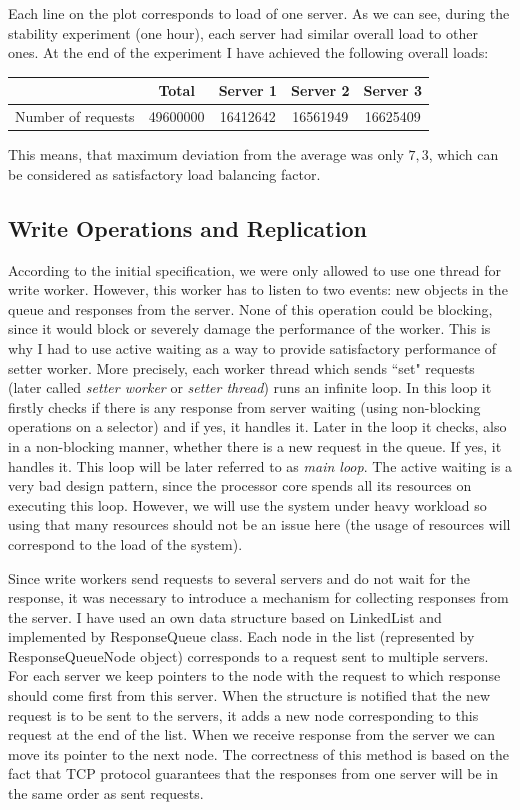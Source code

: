 \documentclass[11pt]{article}
\begin{document}
Each line on the plot corresponds to load of one server. As we can see, during the stability experiment (one hour), each server had similar overall load to other ones. At the end of the experiment I have achieved the following overall loads:
\medskip

\begin{tabular}{|c|c|c|c|c|}
\hline &  \textbf{Total} & \textbf{Server 1} & \textbf{Server 2} & \textbf{Server 3} \\
\hline Number of requests & 49600000 & 16412642 & 16561949 & 16625409 \\
\hline
\end{tabular} 
\medskip

This means, that maximum deviation from the average was only $7,3$\textperthousand, which can be considered as satisfactory load balancing factor.

\subsection{Write Operations and Replication}\label{sec:desc:writes}

According to the initial specification, we were only allowed to use one thread for write worker. However, this worker has to listen to two events: new objects in the queue and responses from the server. None of this operation could be blocking, since it would block or severely damage the performance of the worker. This is why I had to use active waiting as a way to provide satisfactory performance of setter worker. More precisely, each worker thread which sends ``set" requests (later called {\it setter worker} or {\it setter thread}) runs an infinite loop. In this loop it firstly checks if there is any response from server waiting (using non-blocking operations on a selector) and if yes, it handles it. Later in the loop it checks, also in a non-blocking manner, whether there is a new request in the queue. If yes, it handles it. This loop will be later referred to as {\it main loop}. The active waiting is a very bad design pattern, since the processor core spends all its resources on executing this loop. However, we will use the system under heavy workload so using that many resources should not be an issue here (the usage of resources will correspond to the load of the system).

Since write workers send requests to several servers and do not wait for the response, it was necessary to introduce a mechanism for collecting responses from the server. I have used an own data structure based on LinkedList and implemented by ResponseQueue class. Each node in the list (represented by ResponseQueueNode object) corresponds to a request sent to multiple servers. For each server we keep pointers to the node with the request to which response should come first from this server. When the structure is notified that the new request is to be sent to the servers, it adds a new node corresponding to this request at the end of the list. When we receive response from the server we can move its pointer to the next node. The correctness of this method is based on the fact that TCP protocol guarantees that the responses from one server will be in the same order as sent requests.
\end{document}
